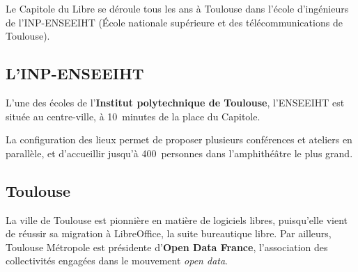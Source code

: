 
Le Capitole du Libre se déroule tous les ans à Toulouse dans l'école
 d'ingénieurs de l'INP-ENSEEIHT (École nationale supérieure
 et des télécommunications de Toulouse). 

\subsection{L'INP-ENSEEIHT}

L'une des écoles de l'\textbf{Institut polytechnique de Toulouse}, l'ENSEEIHT
 est située au centre-ville, à 10~minutes de la place du Capitole.

La configuration des lieux permet de proposer plusieurs conférences et
 ateliers en parallèle, et d'accueillir jusqu'à 400~personnes dans
 l'amphithéâtre le plus grand.

\subsection{Toulouse}

La ville de Toulouse est pionnière en matière de logiciels libres,
 puisqu'elle vient de réussir sa migration à LibreOffice, la suite
 bureautique libre. Par ailleurs, Toulouse Métropole est présidente d’\textbf{Open Data France}, l'association des collectivités engagées dans le mouvement \textit{open data}.


